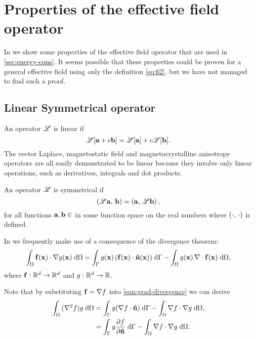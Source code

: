 \newtheorem{theorem}{Theorem}

\newcommand{\ff}{f}
\newcommand{\gf}{g}

\newcommand{\knl}{k}

\chapter{Properties of the effective field operator}
\label{sec:properties-of-field-operators}

In  we show some properties of the effective field operator that are used in \cref{sec:energy-cons}.
It seems possible that these properties could be proven for a general effective field using only the definition \cref{eq:62}, but we have not managed to find such a proof.

\section{Linear Symmetrical operator}
\label{sec:linear-symm-field-operators}

An operator $\mathscr{L}$ is linear if
\begin{equation}
  \mathscr{L}[{\boldsymbol{\mathrm{a}}} + c{\boldsymbol{\mathrm{b}}}] = \mathscr{L}[{\boldsymbol{\mathrm{a}}}] + c\mathscr{L}[{\boldsymbol{\mathrm{b}}}].
\end{equation}
The vector Laplace, magnetostatic field and magnetocrystalline anisotropy operators are all easily demonstrated to be linear because they involve only linear operations, such as derivatives, integrals and dot products.

An operator $\mathscr{L}$ is symmetrical if
\begin{equation}
  \left(\mathscr{L} {\boldsymbol{\mathrm{a}}},\, {\boldsymbol{\mathrm{b}}} \right) = \left({\boldsymbol{\mathrm{a}}},\, \mathscr{L} {\boldsymbol{\mathrm{b}}} \right),
\end{equation}
for all functions ${\boldsymbol{\mathrm{a}}}, {\boldsymbol{\mathrm{b}}} \in $ in some function space on the real numbers where $\left(\cdot,\, \cdot \right)$ is defined.

In  we frequently make use of a consequence of the divergence theorem:
\begin{equation}
  \intd{\fv(\xv) \cdot \grad \gf(\xv)}
  = \intb{\gf(\xv) \, (\fv(\xv) \cdot \nv(\xv))} - \intd{\gf(\xv) \, \div \fv(\xv)},
  \label{eqn:grad-divergence}
\end{equation}
where ${\boldsymbol{\mathrm{f}}} : \mathbb{R}^d \rightarrow \mathbb{R}^d$ and $\gf : \real^d \rightarrow \real$.

Note that by substituting $\fv = \grad \ff$ into \cref{eqn:grad-divergence} we can derive
\begin{equation}
  \begin{aligned}
    \intd{(\lap \ff) \gf}
    &= \intb{\gf (\grad \ff \cdot \nv)} - \intd{\grad \ff \cdot \grad \gf}, \\
    &= \intb{\gf \ddn{\ff}} - \intd{\grad \ff \cdot \grad \gf}.
    \label{eqn:laplace-divergence}
  \end{aligned}
\end{equation}

